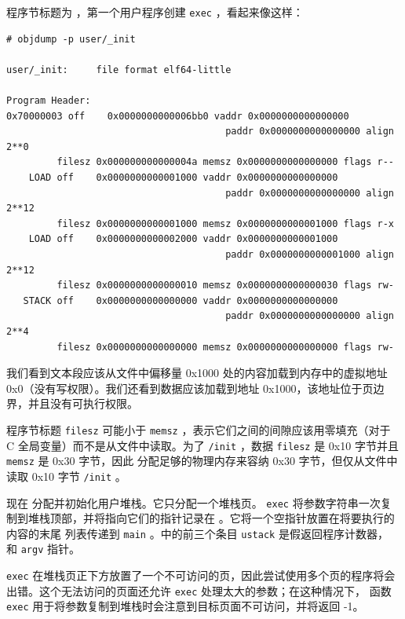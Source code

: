 程序节标题为
       ，第一个用户程序创建
    \lstinline{exec}    ，看起来像这样：
    \begin{footnotesize}
\begin{verbatim}
# objdump -p user/_init

user/_init:     file format elf64-little

Program Header:
0x70000003 off    0x0000000000006bb0 vaddr 0x0000000000000000
                                       paddr 0x0000000000000000 align 2**0
         filesz 0x000000000000004a memsz 0x0000000000000000 flags r--
    LOAD off    0x0000000000001000 vaddr 0x0000000000000000
                                       paddr 0x0000000000000000 align 2**12
         filesz 0x0000000000001000 memsz 0x0000000000001000 flags r-x
    LOAD off    0x0000000000002000 vaddr 0x0000000000001000
                                       paddr 0x0000000000001000 align 2**12
         filesz 0x0000000000000010 memsz 0x0000000000000030 flags rw-
   STACK off    0x0000000000000000 vaddr 0x0000000000000000
                                       paddr 0x0000000000000000 align 2**4
         filesz 0x0000000000000000 memsz 0x0000000000000000 flags rw-
\end{verbatim}
\end{footnotesize}     

我们看到文本段应该从文件中偏移量 0x1000 处的内容加载到内存中的虚拟地址 0x0（没有写权限）。我们还看到数据应该加载到地址 0x1000，该地址位于页边界，并且没有可执行权限。  

程序节标题
    \lstinline{filesz}    可能小于
    \lstinline{memsz}    ，表示它们之间的间隙应该用零填充（对于 C 全局变量）而不是从文件中读取。为了
    \lstinline{/init}    ，数据
    \lstinline{filesz}    是 0x10 字节并且
    \lstinline{memsz}    是 0x30 字节，因此
        分配足够的物理内存来容纳 0x30 字节，但仅从文件中读取 0x10 字节
    \lstinline{/init}    。  

现在
        分配并初始化用户堆栈。它只分配一个堆栈页。
    \lstinline{exec}    将参数字符串一次复制到堆栈顶部，并将指向它们的指针记录在
        。它将一个空指针放置在将要执行的内容的末尾
        列表传递到
    \lstinline{main}    。中的前三个条目
    \lstinline{ustack}    是假返回程序计数器，
        和
    \lstinline{argv}    指针。  

   \lstinline{exec}    在堆栈页正下方放置了一个不可访问的页，因此尝试使用多个页的程序将会出错。这个无法访问的页面还允许
    \lstinline{exec}    处理太大的参数；在这种情况下，
        函数
    \lstinline{exec}    用于将参数复制到堆栈时会注意到目标页面不可访问，并将返回 -1。  

